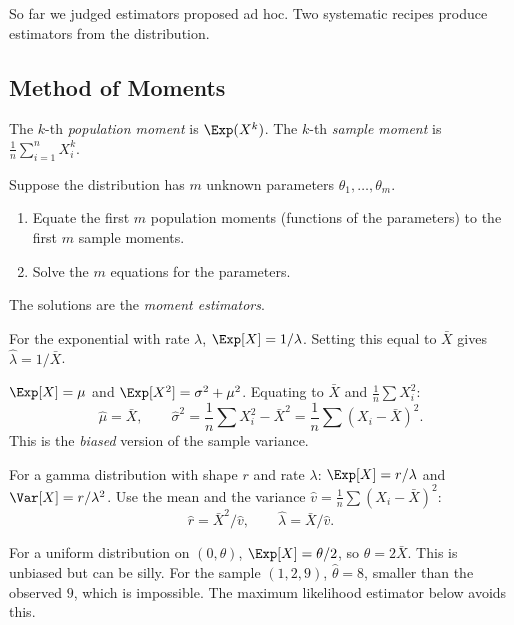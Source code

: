 So far we judged estimators proposed ad hoc. Two systematic recipes produce estimators from the distribution.

\subsection{Method of Moments}

\begin{definition}
The $k$-th \emph{population moment} is $\Exp(X^k)$. The $k$-th \emph{sample moment} is $\frac1n\sum_{i=1}^nX_i^k$.
\end{definition}

\begin{definition}
Suppose the distribution has $m$ unknown parameters $\theta_1,\dots,\theta_m$.
\begin{enumerate}
  \item Equate the first $m$ population moments (functions of the parameters) to the first $m$ sample moments.
  \item Solve the $m$ equations for the parameters.
\end{enumerate}
The solutions are the \emph{moment estimators}.
\end{definition}

\begin{example}[Exponential]\label{ex:momexp}
For the exponential with rate $\lambda$, $\Exp[X]=1/\lambda$. Setting this equal to $\bar{X}$ gives $\hat\lambda=1/\bar{X}$.
\end{example}

\begin{example}[Normal]
$\Exp[X]=\mu$ and $\Exp[X^2]=\sigma^2+\mu^2$. Equating to $\bar{X}$ and $\frac1n\sum X_i^2$:
\[ \hat\mu=\bar{X},\qquad\hat\sigma^2=\frac1n\sum X_i^2-\bar{X}^2=\frac1n\sum(X_i-\bar{X})^2. \]
This is the \emph{biased} version of the sample variance.
\end{example}

\begin{example}[Gamma]
For a gamma distribution with shape $r$ and rate $\lambda$: $\Exp[X]=r/\lambda$ and $\Var[X]=r/\lambda^2$. Use the mean and the variance $\hat v=\frac1n\sum(X_i-\bar{X})^2$:
\[ \hat r=\bar{X}^2/\hat v,\qquad\hat\lambda=\bar{X}/\hat v. \]
\end{example}

\begin{example}[Uniform]
For a uniform distribution on $(0,\theta)$, $\Exp[X]=\theta/2$, so $\hat\theta=2\bar{X}$. This is unbiased but can be silly. For the sample $(1,2,9)$, $\hat\theta=8$, smaller than the observed $9$, which is impossible. The maximum likelihood estimator below avoids this.
\end{example}

